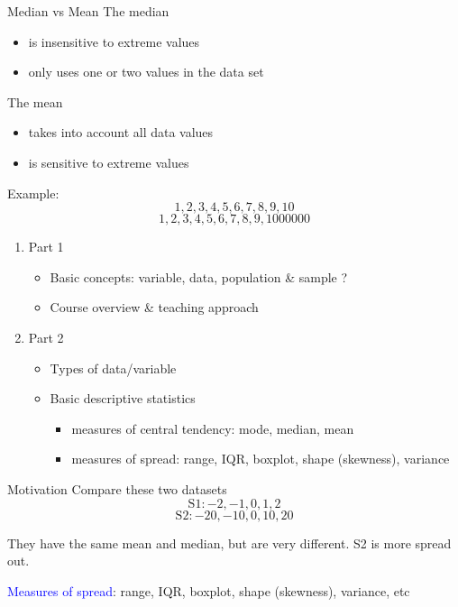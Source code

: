 \documentclass{beamer}
\begin{document}
\begin{frame}{Median vs Mean }
The median 
\begin{itemize}
\item[Pros] is insensitive to extreme values
\item[Cons] only uses one or two values in the data set 
\end{itemize}


The mean 
\begin{itemize}
\item[Pros] takes into account all data values 
\item[Cons] is sensitive to extreme values
\end{itemize}



Example: 
$$1,2,3,4,5,6,7,8,9,10$$
$$1,2,3,4,5, 6,7,8,9,1000000$$
\end{frame}




\begin{frame}

\begin{enumerate}
\item Part 1 
\begin{itemize}
\item Basic concepts: variable, data, population \& sample
?
\item Course overview \& teaching approach
\end{itemize}
\item Part 2 
\begin{itemize}
\item Types of data/variable
\item Basic descriptive statistics
\begin{itemize}
\item measures of central tendency: mode, median, mean
\item measures of spread: range, IQR, boxplot, shape (skewness), variance
\end{itemize}
\end{itemize}

\end{enumerate}
\end{frame}

\begin{frame}{Motivation}
Compare these two datasets 
$$\text{S1}: -2,-1,0,1,2$$
$$\text{S2}: -20,-10,0,10,20$$


They have the same mean and median, but are very different. 
S2 is more spread out. 

\textcolor{blue}{Measures of spread}: {range, IQR, boxplot, shape (skewness), variance}, etc
\end{frame}
\end{document}
